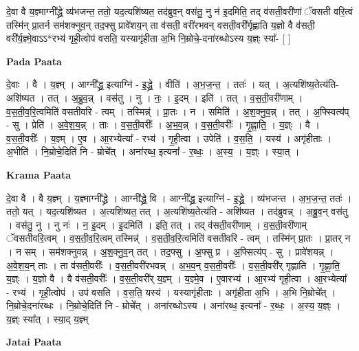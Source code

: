 \documentclass[17pt]{extarticle}
\begin{document}
दे॒वा वै य॒ज्ञ्माग्नी᳚द्ध्रे॒ व्य॑भजन्त॒ ततो॒ यद॒त्यशि॑ष्यत॒ तद॑ब्रुव॒न् वस॑तु॒ नु न॑ इ॒दमिति॒ तद् व॑सती॒वरी॑णां ॅवसती वरि॒त्वं तस्मि॑न् प्रा॒तर्न सम॑शक्नुव॒न् तद॒फ्सु प्रावे॑शय॒न् ता व॑सती॒ वरी॑रभवन् वसती॒वरी᳚र्गृह्णाति य॒ज्ञो वै व॑सती॒ वरी᳚र्य॒ज्ञ्मे॒वाऽऽ*रभ्य॑ गृही॒त्वोप॑ वसति॒ यस्यागृ॑हीता अ॒भि नि॒म्रोचे॒-दना॑रब्धोऽस्य य॒ज्ञ्ः स्या᳚- [  ] \newline

\textbf{Pada Paata} \newline

दे॒वाः । वै । य॒ज्ञ्म् । आग्नी᳚द्ध्र॒ इत्याग्नि॑ - इ॒द्ध्रे॒ । वीति॑ । अ॒भ॒ज॒न्त॒ । ततः॑ । यत् । अ॒त्यशि॑ष्य॒तेत्य॑ति-अशि॑ष्यत । तत् । अ॒ब्रु॒व॒न्न् । वस॑तु । नु । नः॒ । इ॒दम् । इति॑ । तत् । व॒स॒ती॒वरी॑णाम् । व॒स॒ती॒व॒रि॒त्वमिति॑ वसतीवरि - त्वम् । तस्मिन्न्॑ । प्रा॒तः । न । समिति॑ । अ॒श॒क्नु॒व॒न्न् । तत् । अ॒फ्स्वित्य॑प् - सु । प्रेति॑ । अ॒वे॒श॒य॒न्न् । ताः । व॒स॒ती॒वरीः᳚ । अ॒भ॒व॒न्न् । व॒स॒ती॒वरीः᳚ । गृ॒ह्णा॒ति॒ । य॒ज्ञ्ः । वै । व॒स॒ती॒वरीः᳚ । य॒ज्ञ्म् । ए॒व । आ॒रभ्येत्या᳚ - रभ्य॑ । गृ॒ही॒त्वा । उपेति॑ । व॒स॒ति॒ । यस्य॑ । अगृ॑हीताः । अ॒भीति॑ । नि॒म्रोचे॒दिति॑ नि - म्रोचे᳚त् । अना॑रब्ध॒ इत्यना᳚ - र॒ब्धः॒ । अ॒स्य॒ । य॒ज्ञ्ः । स्या॒त् ।  \newline


\textbf{Krama Paata} \newline

दे॒वा वै । वै य॒ज्ञ्म् । य॒ज्ञ्माग्नी᳚द्ध्रे । आग्नी᳚द्ध्रे॒ वि । आग्नी᳚द्ध्र॒ इत्याग्नि॑ - इ॒द्ध्रे॒ । व्य॑भजन्त । अ॒भ॒ज॒न्त॒ ततः॑ । ततो॒ यत् । यद॒त्यशि॑ष्यत । अ॒त्यशि॑ष्यत॒ तत् । अ॒त्यशि॑ष्य॒तेत्य॑ति - अशि॑ष्यत । तद॑ब्रुवन्न् । अ॒ब्रु॒व॒न् वस॑तु । वस॑तु॒ नु । नु नः॑ । न॒ इ॒दम् । इ॒दमिति॑ । इति॒ तत् । तद् व॑सती॒वरी॑णाम् । व॒स॒ती॒वरी॑णाम् ॅवसतीवरि॒त्वम् । व॒स॒ती॒व॒रि॒त्वम् तस्मिन्न्॑ । व॒स॒ती॒व॒रि॒त्वमिति॑ वसतीवरि - त्वम् । तस्मि॑न् प्रा॒तः । प्रा॒तर् न । न सम् । सम॑शक्नुवन्न् । अ॒श॒क्नु॒व॒न् तत् । तद॒फ्सु । अ॒फ्सु प्र । अ॒फ्सित्य॑प् - सु । प्रावे॑शयन्न् । अ॒वे॒श॒य॒न् ताः । ता व॑सती॒वरीः᳚ । व॒स॒ती॒वरी॑रभवन्न् । अ॒भ॒व॒न् व॒स॒ती॒वरीः᳚ । व॒स॒ती॒वरी᳚र् गृह्णाति । गृ॒ह्णा॒ति॒ य॒ज्ञ्ः । य॒ज्ञो वै । वै व॑सती॒वरीः᳚ । व॒स॒ती॒वरी᳚र् य॒ज्ञ्म् । य॒ज्ञ्मे॒व । ए॒वारभ्य॑ । आ॒रभ्य॑ गृही॒त्वा । आ॒रभ्येत्या᳚ - रभ्य॑ । गृ॒ही॒त्वोप॑ । उप॑ वसति । व॒स॒ति॒ यस्य॑ । यस्यागृ॑हीताः । अगृ॑हीता अ॒भि । अ॒भि नि॒म्रोचे᳚त् । नि॒म्रोचे॒दना॑रब्धः । नि॒म्रोचे॒दिति॑ नि - म्रोचे᳚त् । अना॑रब्धोऽस्य । अना॑रब्ध॒ इत्यना᳚ - र॒ब्धः॒ । अ॒स्य॒ य॒ज्ञ्ः । य॒ज्ञ्ः स्या᳚त् । स्या॒द् य॒ज्ञ्म् \newline

\textbf{Jatai Paata} \newline
\end{document}

